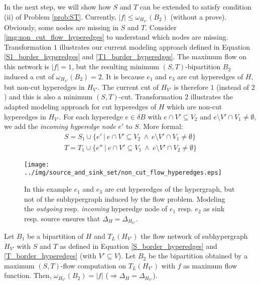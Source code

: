 In the next step, we will show how $S$ and $T$ can be extended to satisfy condition (ii)
of Problem \autoref{prob:ST}. Currently, $|f| \le \omega_{H_{V'}}(B_2)$ (without a prove).
Obviously, some nodes are missing in $S$ and $T$. Consider \autoref{img:non_cut_flow_hyperedges}
to understand which nodes are missing. Transformation $1$ illustrates our current modeling
approach defined in Equation \ref{S1_border_hyperedges} and \ref{T1_border_hyperedges}. The maximum
flow on this network is $|f| = 1$, but the resulting minimum $(S,T)$-bipartition $B_2$ induced 
a cut of $\omega_{H_{V'}}(B_2) = 2$. It is because $e_1$ and $e_3$ are cut
hyperedges of $H$, but non-cut hyperedges in $H_{V'}$. The current cut of $H_{V'}$ is therefore
$1$ (instead of $2$) and this is also a minimum $(S,T)$-cut. Transformation $2$ illustrates the
adapted modeling approach for cut hyperedges of $H$ which are non-cut hyperedges in $H_{V'}$.
For each hyperedge $e \in \delta B$ with $e \cap V' \subseteq V_2$ and $e \setminus V' \cap V_1 \neq \emptyset$, 
we add the \emph{incoming hyperedge node} $e'$ to $S$.
More formal:
\begin{align}
S = S_1 \cup \{e'\ |\ e \cap V' \subseteq V_2 \ \land\ e \setminus V' \cap V_1  \neq \emptyset\} \label{S_border_hyperedges}\\
T = T_1 \cup \{e''\ |\ e \cap V' \subseteq V_1 \ \land\ e \setminus V' \cap V_2 \neq \emptyset \} \label{T_border_hyperedges}
\end{align}

\begin{figure}[ht!]
\centering
\texttt{[image: ../img/source\_and\_sink\_set/non\_cut\_flow\_hyperedges.eps]}
\caption{In this example $e_1$ and $e_3$ are cut hyperedges of the hypergraph, but not of
        the subhypergraph induced by the flow problem. Modeling the \emph{outgoing} resp.
        \emph{incoming} hyperedge node of $e_1$ resp. $e_2$ as sink resp. source ensures
        that $\Delta_H = \Delta_{H_{V'}}$.} 
\label{img:non_cut_flow_hyperedges}
\end{figure}

\begin{lemma}
\label{lemma:delta_proof}
Let $B_1$ be a bipartition of $H$ and $T_L(H_{V'})$ the flow network of subhypergraph
$H_{V'}$ with $S$ and $T$ as defined in Equation \ref{S_border_hyperedges} and \ref{T_border_hyperedges} (with $V' \subseteq V$).
Let $B_2$ be the bipartition obtained by a maximum $(S,T)$-flow computation on $T_L(H_{V'})$
with $f$ as maximum flow function.
Then, $\omega_{H_{V'}}(B_2) = |f|$ ($\Rightarrow \Delta_H = \Delta_{H_{V'}}$).
\end{lemma}
 

